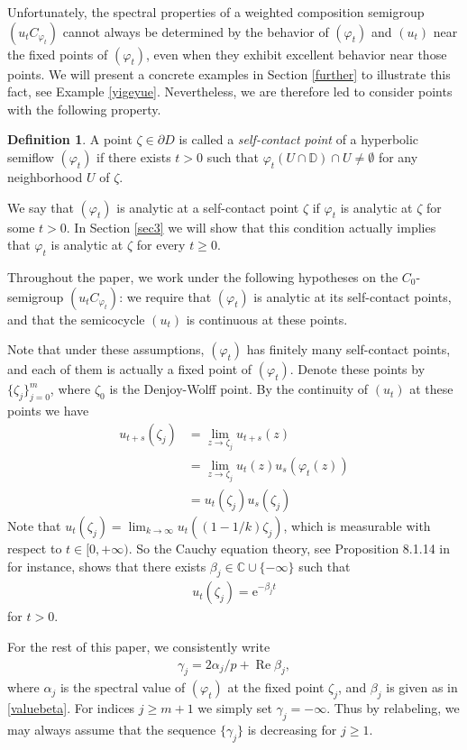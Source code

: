 \documentclass{amsart}
\theoremstyle{proclaim}
\theoremstyle{fancyproclaim}
\theoremstyle{definition}
\newtheorem{definition}[theorem]{Definition}
\theoremstyle{fancystatement}
\numberwithin{equation}{section}
\begin{document}
Unfortunately, the spectral properties of a weighted composition semigroup $(u_tC_{\varphi_t})$ cannot always be determined by the behavior of  $(\varphi_t)$ and $(u_t)$ near the fixed points of $(\varphi_t)$, even when they exhibit excellent behavior near those points. We will present a concrete examples in Section \ref{further} to illustrate this fact, see Example \ref{yigeyue}. Nevertheless, we are therefore led to consider points with the following property.

\begin{definition}
A point $\zeta\in\partial D$ is called a \emph{self-contact point} of a hyperbolic semiflow $(\varphi_t)$ if there exists $t>0$ such that $\varphi_t(U\cap\mathbb{D})\cap U\ne\emptyset$ for any neighborhood $U$ of $\zeta$.
\end{definition}

We say that $(\varphi_t)$ is analytic at a self-contact point $\zeta$ if $\varphi_t$ is analytic at $\zeta$ for some $t>0$. In Section \ref{sec3} we will show that this condition actually implies that $\varphi_t$ is analytic at $\zeta$ for every $t\geq0$.

Throughout the paper, we work under the following hypotheses on the $C_0$-semigroup $(u_tC_{\varphi_t})$: we require that $(\varphi_t)$ is analytic at its self-contact points, and that the semicocycle $(u_t)$ is continuous at these points.

Note that under these assumptions, $(\varphi_t)$ has finitely many self-contact points, and each of them is actually a fixed point of  $(\varphi_t)$. Denote these points by $\{\zeta_j\}_{j=0}^m$, where $\zeta_0$ is the Denjoy-Wolff point. By the continuity of $(u_t)$ at these points we have
\begin{align*}
u_{t+s}(\zeta_j) &= \lim_{z\to\zeta_j}u_{t+s}(z)\\
&=\lim_{z\to\zeta_j}u_t(z)u_s(\varphi_t(z))\\
&=u_t(\zeta_j)u_s(\zeta_j)
\end{align*}
Note that $u_t(\zeta_j)=\lim_{k\to\infty} u_t((1-1/k)\zeta_j)$, which is measurable with respect to $t\in[0,+\infty)$. So the Cauchy equation theory, see Proposition 8.1.14 in \cite{cs} for instance, shows that there exists $\beta_j\in\mathbb{C}\cup\{-\infty\}$ such that 
\begin{align}\label{valuebeta}
u_t(\zeta_j)= \mathrm{e}^{-\beta_j t}
\end{align}
for $t>0$. 

For the rest of this paper, we consistently write 
\begin{align}\label{gamma}
\gamma_j=2\alpha_j/p+ \operatorname{Re}\beta_j,
\end{align}
where $\alpha_j$ is the spectral value of $(\varphi_t)$ at the fixed point $\zeta_j$, and $\beta_j$ is given as in \eqref{valuebeta}. For indices $j\geq m+1$ we simply set $\gamma_j=-\infty$. Thus by relabeling, we may always assume that the sequence $\{\gamma_j\}$ is decreasing for $j\geq 1$.
\end{document}
